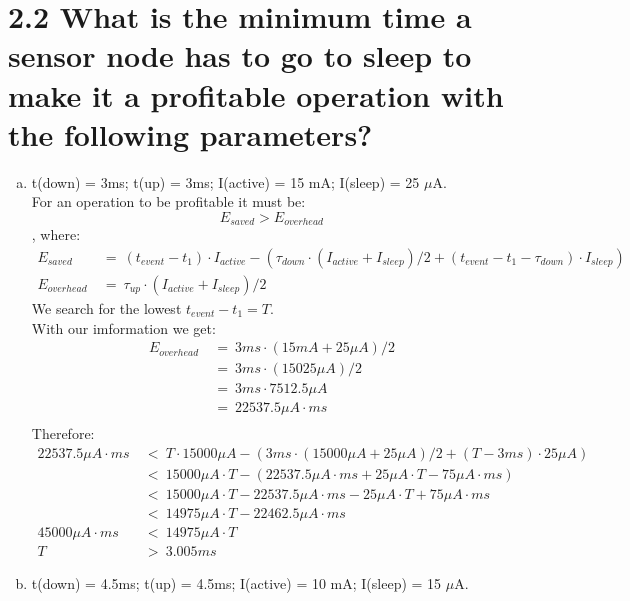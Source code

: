\documentclass{article}
\begin{document}
	\section*{2.2 What is the minimum time a sensor node has to go to sleep to make it a profitable operation with the following parameters?}
	\begin{adjustwidth}{2em}{2em}
		\begin{enumerate}[a)]
			\item t(down) = 3ms; t(up) = 3ms; I(active) = 15 mA; I(sleep) = 25 $\mu$A. \\
			For an operation to be profitable it must be:
			\[
				E_{saved} > E_{overhead}
			\]
			, where:
			\begin{align*}
				E_{saved} \ & = \ (t_{event} - t_1) \cdot I_{active} - (\tau _{down} \cdot (I_{active} + I_{sleep}) / 2 + (t_{event} - t_1 - \tau _{down}) \cdot I_{sleep}) \\
				E_{overhead} \ & = \ \tau _{up} \cdot (I_{active} + I_{sleep}) / 2
			\end{align*}
			We search for the lowest $t_{event} - t_1 = T$. \\
			With our imformation we get:
			\begin{align*}
				E_{overhead} \ & = \ 3ms \cdot (15mA + 25 \mu A) / 2 \\
				& = \ 3ms \cdot (15025 \mu A) / 2 \\
				& = \ 3ms \cdot 7512.5 \mu A \\
				& = \ 22537.5 \mu A \cdot ms \\
			\end{align*}
			Therefore:
			\begin{align*}
				22537.5\mu A \cdot ms \ & < \ T \cdot 15000 \mu A - (3ms \cdot (15000 \mu A + 25 \mu A) / 2 + (T - 3ms) \cdot 25 \mu A) \\
				& < \ 15000 \mu A \cdot T - (22537.5 \mu A \cdot ms + 25 \mu A \cdot T - 75 \mu A \cdot ms) \\
				& < \ 15000 \mu A \cdot T - 22537.5 \mu A \cdot ms - 25 \mu A \cdot T + 75 \mu A \cdot ms \\
				& < \ 14975 \mu A \cdot T - 22462.5 \mu A \cdot ms \\
				45000 \mu A \cdot ms \ & < \ 14975 \mu A \cdot T \\
				T \ & > \ 3.005 ms 
			\end{align*}
			\newpage
			\item t(down) = 4.5ms; t(up) = 4.5ms; I(active) = 10 mA; I(sleep) = 15 $\mu$A. \\

\end{enumerate}
\end{adjustwidth}
\end{document}
